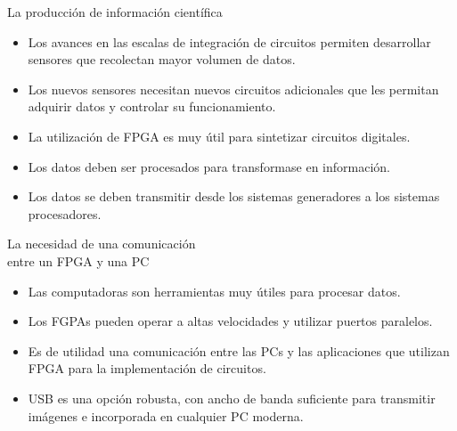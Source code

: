 \begin{frame}{La producción de información científica}
	\begin{itemize}
		\item Los avances en las escalas de integración de circuitos permiten desarrollar sensores que recolectan mayor volumen de datos.
		\item Los nuevos sensores necesitan nuevos circuitos adicionales que les permitan adquirir datos y controlar su funcionamiento.
		\item La utilización de FPGA es muy útil para sintetizar circuitos digitales.
		\item Los datos deben ser procesados para transformase en información.
		\item Los datos se deben transmitir desde los sistemas generadores a los sistemas procesadores.
	\end{itemize}
\end{frame}
\begin{frame}{La necesidad de una comunicación\\entre un FPGA y una PC}
	\begin{itemize}
		\item Las computadoras son herramientas muy útiles para procesar datos.
		\item Los FGPAs pueden operar a altas velocidades y utilizar puertos paralelos.
		\item Es de utilidad una comunicación entre las PCs y las aplicaciones que utilizan FPGA para la implementación de circuitos.
		\item USB es una opción robusta, con ancho de banda suficiente para transmitir imágenes e incorporada en cualquier PC moderna.
	\end{itemize}
\end{frame}